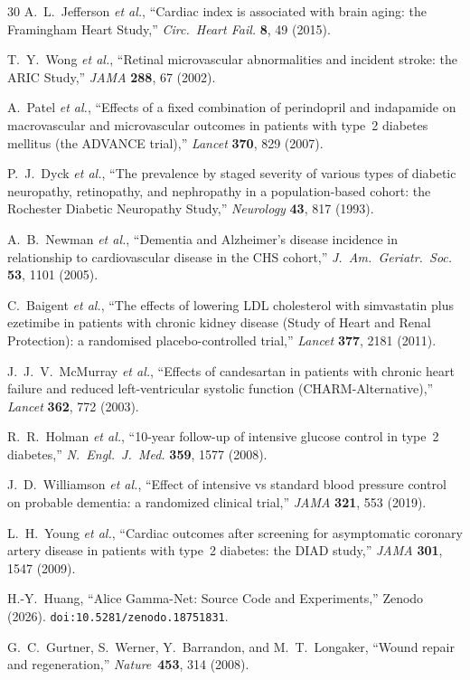 ﻿\documentclass[aps,pre,twocolumn,superscriptaddress,floatfix]{revtex4-2}
\begin{document}
\begin{thebibliography}{30}
A.~L.~Jefferson \emph{et al.},
``Cardiac index is associated with brain aging:
  the Framingham Heart Study,''
\emph{Circ.\ Heart Fail.} \textbf{8}, 49 (2015).

T.~Y.~Wong \emph{et al.},
``Retinal microvascular abnormalities and incident stroke:
  the ARIC Study,''
\emph{JAMA} \textbf{288}, 67 (2002).

A.~Patel \emph{et al.},
``Effects of a fixed combination of perindopril and
  indapamide on macrovascular and microvascular outcomes
  in patients with type~2 diabetes mellitus (the ADVANCE trial),''
\emph{Lancet} \textbf{370}, 829 (2007).

P.~J.~Dyck \emph{et al.},
``The prevalence by staged severity of various types of
  diabetic neuropathy, retinopathy, and nephropathy in a
  population-based cohort: the Rochester Diabetic Neuropathy
  Study,''
\emph{Neurology} \textbf{43}, 817 (1993).

A.~B.~Newman \emph{et al.},
``Dementia and Alzheimer's disease incidence in
  relationship to cardiovascular disease in the CHS cohort,''
\emph{J.\ Am.\ Geriatr.\ Soc.} \textbf{53}, 1101 (2005).

C.~Baigent \emph{et al.},
``The effects of lowering LDL cholesterol with simvastatin
  plus ezetimibe in patients with chronic kidney disease
  (Study of Heart and Renal Protection): a randomised
  placebo-controlled trial,''
\emph{Lancet} \textbf{377}, 2181 (2011).

J.~J.~V.~McMurray \emph{et al.},
``Effects of candesartan in patients with chronic heart
  failure and reduced left-ventricular systolic function
  (CHARM-Alternative),''
\emph{Lancet} \textbf{362}, 772 (2003).

R.~R.~Holman \emph{et al.},
``10-year follow-up of intensive glucose control in type~2
  diabetes,''
\emph{N.\ Engl.\ J.\ Med.} \textbf{359}, 1577 (2008).

J.~D.~Williamson \emph{et al.},
``Effect of intensive vs standard blood pressure control on
  probable dementia: a randomized clinical trial,''
\emph{JAMA} \textbf{321}, 553 (2019).

L.~H.~Young \emph{et al.},
``Cardiac outcomes after screening for asymptomatic
  coronary artery disease in patients with type~2 diabetes:
  the DIAD study,''
\emph{JAMA} \textbf{301}, 1547 (2009).

H.-Y.~Huang,
``Alice Gamma-Net: Source Code and Experiments,''
Zenodo (2026). \texttt{doi:10.5281/zenodo.18751831}.

G.~C.~Gurtner, S.~Werner, Y.~Barrandon, and
M.~T.~Longaker,
``Wound repair and regeneration,''
\emph{Nature}\ \textbf{453}, 314 (2008).

\end{thebibliography}
\end{document}
